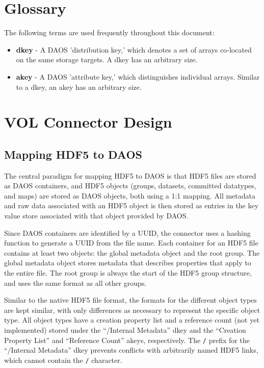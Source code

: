 
\section{Glossary}

The following terms are used frequently throughout this document:

\begin{itemize}
    \item \textbf{dkey} - A DAOS 'distribution key,' which denotes a set of arrays co-located on the same storage targets. A dkey has an arbitrary size.
    \item \textbf{akey} - A DAOS 'attribute key,' which distinguishes individual arrays. Similar to a dkey, an akey has an arbitrary size.
\end{itemize}

\newpage

\section{VOL Connector Design}

\subsection{Mapping HDF5 to DAOS}

The central paradigm for mapping HDF5 to DAOS is that HDF5 files are stored as DAOS containers, and HDF5 objects (groups, datasets, committed datatypes, and maps) are stored as DAOS objects, both using a 1:1 mapping. All metadata and raw data associated with an HDF5 object is then stored as entries in the key value store associated with that object provided by DAOS.

Since DAOS containers are identified by a UUID, the connector uses a hashing function to generate a UUID from the file name. Each container for an HDF5 file contains at least two objects: the global metadata object and the root group. The global metadata object stores metadata that describes properties that apply to the entire file. The root group is always the start of the HDF5 group structure, and uses the same format as all other groups.

Similar to the native HDF5 file format, the formats for the different object types are kept similar, with only differences as necessary to represent the specific object type. All object types have a creation property list and a reference count (not yet implemented) stored under the ``/Internal Metadata'' dkey and the ``Creation Property List'' and ``Reference Count'' akeys, respectively. The \verb+/+ prefix for the ``/Internal Metadata'' dkey prevents conflicts with arbitrarily named HDF5 links, which cannot contain the \verb+/+ character.

